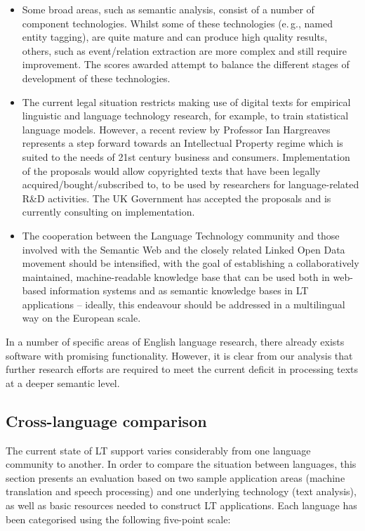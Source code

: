 \begin{multicols}{2}
\begin{itemize}
\item Some broad areas, such as semantic analysis, consist of a number of component technologies. Whilst some of these technologies (e.\,g., named entity tagging), are quite mature and can produce high quality results, others, such as event/relation extraction are more complex and still require improvement. The scores awarded attempt to balance the different stages of development of these technologies.     
\item The current legal situation restricts making use of digital texts for empirical linguistic and language technology research, for example, to train statistical language models.  However, a recent review by Professor Ian Hargreaves represents a step forward towards an Intellectual Property regime which is suited to the needs of 21st century business and consumers. Implementation of the proposals would allow copyrighted texts that have been legally acquired/bought/subscribed to, to be used by researchers for language-related R\&D activities. The UK Government has accepted the proposals and is currently consulting on implementation.
\item The cooperation between the Language Technology community and those involved with the Semantic Web and the closely related Linked Open Data movement should be intensified, with the goal of establishing a collaboratively maintained, machine-readable knowledge base that can be used both in web-based information systems and as semantic knowledge bases in LT applications -- ideally, this endeavour should be addressed in a multilingual way on the European scale.  
\end{itemize}

In a number of specific areas of English language research, there already exists software with promising functionality. However, it is clear from our analysis that further research efforts are required to meet the current deficit in processing texts at a deeper semantic level.

\subsection{Cross-language comparison}

The current state of LT support varies considerably from one language community to another. In order to compare the situation between languages, this section presents an evaluation based on two sample application areas (machine translation and speech processing) and one underlying technology (text analysis), as well as basic resources needed to construct LT applications. Each language has been categorised using the following five-point scale:


\end{multicols}
